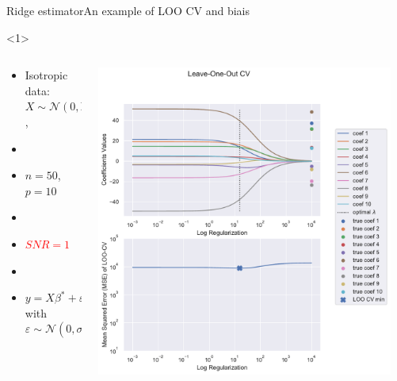 \documentclass[10pt,aspectratio=43]{beamer}
\begin{document}
\begin{frame}{Ridge estimator}{An example of LOO CV and biais}
    \begin{onlyenv}<1>
        \begin{columns}
            \begin{column}{0.4\textwidth}
                \begin{itemize}
                    \item Isotropic data: $X\sim\mathcal{N}(0,\mathrm{Id})$,
                    \item[]
                    \item $n=50$, $p=10$
                    \item[]
                    \item \textcolor{red}{$SNR=1$}
                    \item[]
                    \item $y = X\beta^*+\varepsilon$ with $\varepsilon\sim \mathcal{N}(0, \sigma^2\mathrm{Id})$
                \end{itemize}
            \end{column}
            \begin{column}{0.7\textwidth}
                \begin{center}
                        \includegraphics[width=0.95\textwidth]{path_ridge_complete_1_.pdf}

\end{center}
\end{column}
\end{columns}
\end{onlyenv}
\end{frame}
\end{document}
